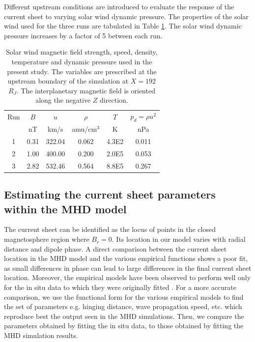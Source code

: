 Different upstream conditions are introduced to evaluate the response of the current sheet to varying solar wind dynamic pressure. The properties of the solar wind used for the three runs are tabulated in Table \ref{tab:sw-conditions-chp5}. The solar wind dynamic pressure increases by a factor of 5 between each run. 

\begin{table}
    \centering
    \begin{tabular}{c|c|c|c|c|c}

    Run  &$B$  &$u$  &$\rho$     &$T$  &$p_d=\rho u^2$\\
         &nT   &km/s &amu/cm$^3$ &K    &nPa\\
    \hline
    1    &0.31  &322.04  &0.062  &4.3E2  &0.011\\
    2    &1.00  &400.00  &0.200  &2.0E5  &0.053\\
    3    &2.82  &532.46  &0.564  &8.8E5  &0.267\\

    \end{tabular}
    \caption{Solar wind magnetic field strength, speed, density, temperature and dynamic pressure used in the present study. The variables are prescribed at the upstream boundary of the simulation at $X=192$ $R_J$. The interplanetary magnetic field is oriented along the negative $Z$ direction.}
    \label{tab:sw-conditions-chp5}
\end{table}

\subsection{Estimating the current sheet parameters within the MHD model}
The current sheet can be identified as the locus of points in the closed magnetosphere region where $B_r=0$. Its location in our model varies with radial distance and dipole phase. A direct comparison between the current sheet location in the MHD model and the various empirical functions shows a poor fit, as small differences in phase can lead to large differences in the final current sheet location. Moreover, the empirical models have been observed to perform well only for the in situ data to which they were originally fitted \cite{Khurana1992a, Behannon1981}. For a more accurate comparison, we use the functional form for the various empirical models to find the set of parameters e.g. hinging distance, wave propagation speed, etc. which reproduce best the output seen in the MHD simulations. Then, we compare the parameters obtained by fitting the in situ data, to those obtained by fitting the MHD simulation results. 

